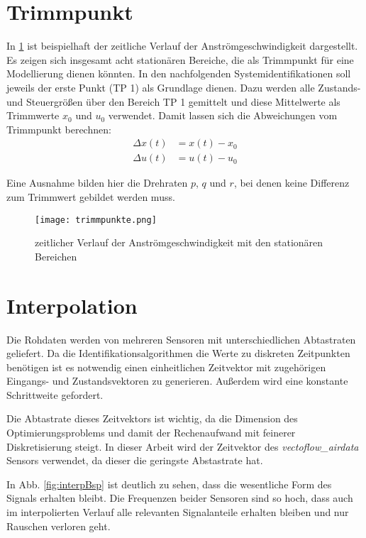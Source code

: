 \section{Trimmpunkt} %
In \cref{fig:trimmpunkte} ist beispielhaft der zeitliche Verlauf der Anströmgeschwindigkeit dargestellt. Es zeigen sich 
insgesamt acht stationären Bereiche, die als Trimmpunkt für eine Modellierung dienen könnten. In den nachfolgenden 
Systemidentifikationen soll jeweils der erste Punkt (TP 1) als Grundlage dienen. Dazu werden alle Zustands- und Steuergrößen 
über den Bereich TP 1 gemittelt und diese Mittelwerte als Trimmwerte $ x_0 $ und $ u_0 $ verwendet. Damit lassen sich die 
Abweichungen vom Trimmpunkt berechnen:
\begin{equation}
	\begin{split}
		\Delta x(t) &= x(t)-x_0\\
		\Delta u(t) &= u(t)-u_0
	\end{split}
\end{equation}

Eine Ausnahme bilden hier die Drehraten $ p $, $ q $ und $ r $, bei denen keine Differenz zum Trimmwert gebildet werden muss.


\begin{figure}[h!]
	\centering
	\texttt{[image: trimmpunkte.png]}
	\caption{zeitlicher Verlauf der Anströmgeschwindigkeit mit den stationären Bereichen}
	\label{fig:trimmpunkte}
\end{figure}




\section{Interpolation} \label{sec:interp} %

Die Rohdaten werden von mehreren Sensoren mit unterschiedlichen Abtastraten geliefert. Da die Identifikationsalgorithmen die Werte zu diskreten Zeitpunkten benötigen ist es notwendig einen einheitlichen Zeitvektor mit zugehörigen Eingangs- und Zustandsvektoren zu generieren. Außerdem wird eine konstante Schrittweite gefordert.

Die Abtastrate dieses Zeitvektors ist wichtig, da die Dimension des Optimierungsproblems und damit der Rechenaufwand mit feinerer Diskretisierung steigt. In dieser Arbeit wird der Zeitvektor des \textit{vectoflow\_airdata} Sensors verwendet, da dieser die geringste Abstastrate hat.

In Abb. \ref{fig:interpBsp} ist deutlich zu sehen, dass die wesentliche Form des Signals erhalten bleibt. Die Frequenzen beider Sensoren sind so hoch, dass auch im interpolierten Verlauf alle relevanten Signalanteile erhalten bleiben und nur Rauschen verloren geht.


